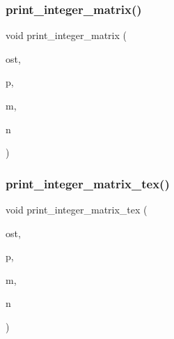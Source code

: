 \subsubsection{\texorpdfstring{print\+\_\+integer\+\_\+matrix()}{print\_integer\_matrix()}}
{\footnotesize\ttfamily void print\+\_\+integer\+\_\+matrix (\begin{DoxyParamCaption}\item[{ostream \&}]{ost,  }\item[{\mbox{\hyperlink{galois_8h_a09fddde158a3a20bd2dcadb609de11dc}{I\+NT}} $\ast$}]{p,  }\item[{\mbox{\hyperlink{galois_8h_a09fddde158a3a20bd2dcadb609de11dc}{I\+NT}}}]{m,  }\item[{\mbox{\hyperlink{galois_8h_a09fddde158a3a20bd2dcadb609de11dc}{I\+NT}}}]{n }\end{DoxyParamCaption})}

\mbox{\label{util_8_c_aef00fc6ceb34669a3d92944906509bd1}} 
\subsubsection{\texorpdfstring{print\+\_\+integer\+\_\+matrix\+\_\+tex()}{print\_integer\_matrix\_tex()}}
{\footnotesize\ttfamily void print\+\_\+integer\+\_\+matrix\+\_\+tex (\begin{DoxyParamCaption}\item[{ostream \&}]{ost,  }\item[{\mbox{\hyperlink{galois_8h_a09fddde158a3a20bd2dcadb609de11dc}{I\+NT}} $\ast$}]{p,  }\item[{\mbox{\hyperlink{galois_8h_a09fddde158a3a20bd2dcadb609de11dc}{I\+NT}}}]{m,  }\item[{\mbox{\hyperlink{galois_8h_a09fddde158a3a20bd2dcadb609de11dc}{I\+NT}}}]{n }\end{DoxyParamCaption})}

\mbox{\label{util_8_c_ad4f65d58518e9c514ec41796782c7bf0}} 
